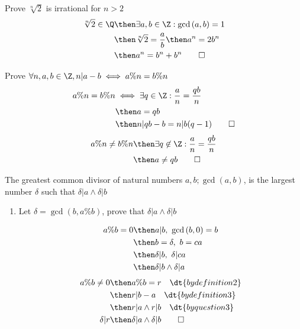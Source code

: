 \documentclass[basic]{nosvagor-notes}
\begin{document}
  \begin{multicols}{2}

  Prove \(\sqrt[n]{2}\) is irrational for \(n > 2\)\\
  \begin{align*}
  \sqrt[n]{2} \in \Q &\then \exists a,b \in \Z : \gcd{(a,b)}=1 \\
                       &\then \sqrt[n]{2} = \frac{a}{b} \then a^n = 2b^n \\
                       &\then a^n = b^n + b^n \qed
  \end{align*}

  Prove \(\forall  n,a,b \in \Z, n|a-b \iff a\%n = b\%n\)
    \begin{align*}
      a\%n = b\%n &\iff \exists q \in \Z : \frac{a}{n} = \frac{qb}{n} \\
                  &\then a=qb \\
                  &\then n|qb-b = n|b(q-1) \qed
    \end{align*}
    \begin{align*}
      a\%n \neq b\%n &\then \exists q \not\in \Z : \frac{a}{n} = \frac{qb}{n} \\
                     &\then a \neq qb \qed
    \end{align*}

  The greatest common divisor of natural numbers \(a, b; \gcd(a,b) \),
      is the largest number \(\delta\) such that \(\delta|a \land \delta|b\)
      \begin{enumerate}[label=(\alph*)]

        \item Let \(\delta = \gcd(b, a\%b)\), prove that \(\delta|a \land
          \delta|b\)

          \begin{align*}
            a\%b = 0 &\then a|b,~\gcd{(b,0)} = b \\
                     &\then b = \delta,~ b = ca \\
                     &\then \delta|b,~ \delta|ca \\
                     &\then \delta|b \land \delta|a
          \end{align*}
          \begin{align*}
            a\%b \neq 0 &\then a\%b = r \quad \dt{by definition 2} \\
                        &\then r|b-a \quad \dt{by definition 3} \\
                        &\then r|a \land r|b \quad \dt{by question 3} \\
                        \delta | r
                        &\then \delta|a \land \delta|b \qed
          \end{align*}


\end{enumerate}
\end{multicols}
\end{document}
